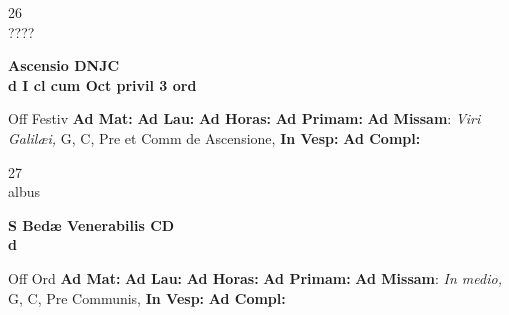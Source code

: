 \documentclass[10pt, openany]{book}
\begin{document}
    \begin{center}
        \begin{minipage}{3.5in}
            \vspace{2em}
            \begin{minipage}{0.5in}
                {\Huge 26} \\
                {\normalsize ????}
            \end{minipage}
            \begin{minipage}{3.0in}
                \textbf{ \large Ascensio DNJC \\
                \textnormal{\normalsize d I cl cum Oct privil 3 ord}}

            \end{minipage}
            \begin{justify}Off Festiv
                \textbf{Ad Mat: }
                \textbf{Ad Lau: }
                \textbf{Ad Horas: }
                \textbf{Ad Primam: }\textbf{Ad Missam}: \textit{Viri Galilæi,} G, C, Pre et Comm de Ascensione, 
                \textbf{In Vesp: }
                \textbf{Ad Compl: }
            \end{justify}
        \end{minipage}
    \end{center}

    \begin{center}
        \begin{minipage}{3.5in}
            \vspace{2em}
            \begin{minipage}{0.5in}
                {\Huge 27} \\
                {\normalsize albus}
            \end{minipage}
            \begin{minipage}{3.0in}
                \textbf{ \large S Bedæ Venerabilis CD \\
                \textnormal{\normalsize d}}

            \end{minipage}
            \begin{justify}Off Ord
                \textbf{Ad Mat: }
                \textbf{Ad Lau: }
                \textbf{Ad Horas: }
                \textbf{Ad Primam: }\textbf{Ad Missam}: \textit{In medio,} G, C, Pre Communis, 
                \textbf{In Vesp: }
                \textbf{Ad Compl: }
            \end{justify}
        \end{minipage}
    \end{center}
\end{document}
